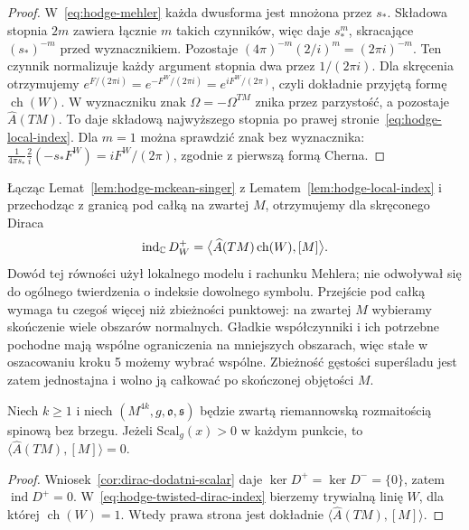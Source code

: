 \begin{proof}
W~\eqref{eq:hodge-mehler} każda dwusforma jest mnożona przez $s_*$.
Składowa stopnia $2m$ zawiera łącznie $m$ takich czynników,
więc daje $s_*^m$, skracające $(s_*)^{-m}$ przed wyznacznikiem.
Pozostaje $(4\pi)^{-m}(2/i)^m=(2\pi i)^{-m}$.
Ten czynnik normalizuje każdy argument stopnia dwa przez $1/(2\pi i)$.
Dla skręcenia otrzymujemy
$e^{F/(2\pi i)}=e^{-F^W/(2\pi i)}=e^{iF^W/(2\pi)}$,
czyli dokładnie przyjętą formę $\operatorname{ch}(W)$.
W wyznaczniku znak $\Omega=-\Omega^{TM}$ znika przez parzystość,
a pozostaje $\widehat A(TM)$.
To daje składową najwyższego stopnia
po prawej stronie~\eqref{eq:hodge-local-index}.
Dla $m=1$ można sprawdzić znak bez wyznacznika:
$\frac1{4\pi s_*}\frac2i(-s_*F^W)
=iF^W/(2\pi)$, zgodnie z pierwszą formą Cherna.
\end{proof}

Łącząc Lemat~\ref{lem:hodge-mckean-singer}
z Lematem~\ref{lem:hodge-local-index} i przechodząc
z granicą pod całką na zwartej \(M\), otrzymujemy
dla skręconego Diraca
\begin{equation}\label{eq:hodge-twisted-dirac-index}
 \operatorname{ind}_{\mathbb{C}}D_W^+
 =\bigl\langle\widehat A(TM)\operatorname{ch}(W),
                 [M]\bigr\rangle.
\end{equation}
Dowód tej równości użył lokalnego modelu i
rachunku Mehlera; nie odwoływał się do ogólnego
twierdzenia o indeksie dowolnego symbolu.
Przejście pod całką wymaga tu czegoś więcej niż zbieżności
punktowej: na zwartej $M$ wybieramy skończenie wiele
obszarów normalnych. Gładkie współczynniki i ich potrzebne
pochodne mają wspólne ograniczenia na mniejszych obszarach,
więc stałe w oszacowaniu kroku 5 możemy wybrać wspólne.
Zbieżność gęstości superśladu jest zatem jednostajna
i wolno ją całkować po skończonej objętości $M$.

\begin{wniosek}
\label{cor:dirac-ahat-dodatni-scalar}
Niech $k\geq1$ i niech $(M^{4k},g,\mathfrak o,\mathfrak s)$
będzie zwartą riemannowską rozmaitością spinową bez brzegu.
Jeżeli $\mathrm{Scal}_g(x)>0$ w każdym punkcie, to
$\langle\widehat A(TM),[M]\rangle=0$.
\end{wniosek}
\begin{proof}
Wniosek~\ref{cor:dirac-dodatni-scalar} daje
$\ker D^+=\ker D^-=\{0\}$, zatem $\operatorname{ind}D^+=0$.
W~\eqref{eq:hodge-twisted-dirac-index} bierzemy trywialną
linię $W$, dla której $\operatorname{ch}(W)=1$.
Wtedy prawa strona jest dokładnie
$\langle\widehat A(TM),[M]\rangle$.
\end{proof}

